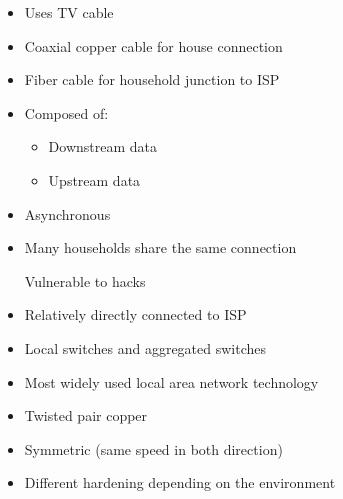 \begin{itemize}
\begin{itemize}
\begin{itemize}
                    \end{itemize}
                    \begin{itemize}
                        \item Uses TV cable
                        \item Coaxial copper cable for house connection
                        \item Fiber cable for household junction to ISP
                        \item Composed of:
                            \begin{itemize}
                                \item Downstream data
                                \item Upstream data
                            \end{itemize}
                        \item Asynchronous
                        \item Many households share the same connection
                            \begin{itemize}
                                \icon Vulnerable to hacks
                            \end{itemize}
                    \end{itemize}
                    \begin{itemize}
                        \item Relatively directly connected to ISP
                        \item Local switches and aggregated switches
                    \end{itemize}
                    \begin{itemize}
                        \item Most widely used local area network technology
                        \item Twisted pair copper
                        \item Symmetric (same speed in both direction)
                    \end{itemize}
                    \begin{itemize}
                        \item Different hardening depending on the environment
                    \end{itemize}

\end{itemize}
\end{itemize}
